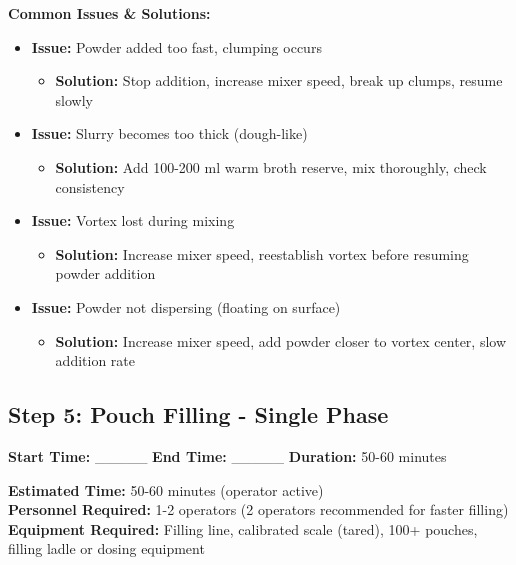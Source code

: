 \textbf{Common Issues \& Solutions:}
\begin{itemize}
\item \textbf{Issue:} Powder added too fast, clumping occurs
  \begin{itemize}
  \item \textbf{Solution:} Stop addition, increase mixer speed, break up clumps, resume slowly
  \end{itemize}
\item \textbf{Issue:} Slurry becomes too thick (dough-like)
  \begin{itemize}
  \item \textbf{Solution:} Add 100-200 ml warm broth reserve, mix thoroughly, check consistency
  \end{itemize}
\item \textbf{Issue:} Vortex lost during mixing
  \begin{itemize}
  \item \textbf{Solution:} Increase mixer speed, reestablish vortex before resuming powder addition
  \end{itemize}
\item \textbf{Issue:} Powder not dispersing (floating on surface)
  \begin{itemize}
  \item \textbf{Solution:} Increase mixer speed, add powder closer to vortex center, slow addition rate
  \end{itemize}
\end{itemize}


\subsection*{Step 5: Pouch Filling - Single Phase}

\textbf{Start Time:} \_\_\_\_\_ \hspace{1cm} \textbf{End Time:} \_\_\_\_\_ \hspace{1cm} \textbf{Duration:} 50-60 minutes

\vspace{0.5em}

\textbf{Estimated Time:} 50-60 minutes (operator active) \\
\textbf{Personnel Required:} 1-2 operators (2 operators recommended for faster filling) \\
\textbf{Equipment Required:} Filling line, calibrated scale (tared), 100+ pouches, filling ladle or dosing equipment


